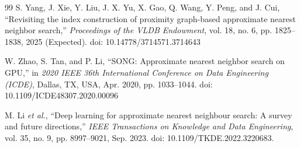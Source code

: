 \documentclass[conference]{IEEEtran}
\begin{document}
\begin{thebibliography}{99}
S. Yang, J. Xie, Y. Liu, J. X. Yu, X. Gao, Q. Wang, Y. Peng, and J. Cui, “Revisiting the index construction of proximity graph-based approximate nearest neighbor search,” \emph{Proceedings of the VLDB Endowment}, vol. 18, no. 6, pp. 1825–1838, 2025 (Expected). doi: 10.14778/3714571.3714643

W. Zhao, S. Tan, and P. Li, “SONG: Approximate nearest neighbor search on GPU,” in \emph{2020 IEEE 36th International Conference on Data Engineering (ICDE)}, Dallas, TX, USA, Apr. 2020, pp. 1033–1044. doi: 10.1109/ICDE48307.2020.00096

M. Li \emph{et al.}, “Deep learning for approximate nearest neighbour search: A survey and future directions,” \emph{IEEE Transactions on Knowledge and Data Engineering}, vol. 35, no. 9, pp. 8997–9021, Sep. 2023. doi: 10.1109/TKDE.2022.3220683.

\end{thebibliography}
\end{document}
